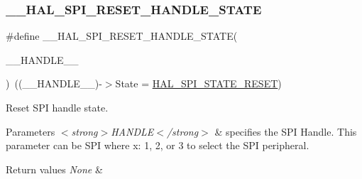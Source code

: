 \subsubsection{\texorpdfstring{\+\_\+\+\_\+\+H\+A\+L\+\_\+\+S\+P\+I\+\_\+\+R\+E\+S\+E\+T\+\_\+\+H\+A\+N\+D\+L\+E\+\_\+\+S\+T\+A\+TE}{\_\_HAL\_SPI\_RESET\_HANDLE\_STATE}}
{\footnotesize\ttfamily \#define \+\_\+\+\_\+\+H\+A\+L\+\_\+\+S\+P\+I\+\_\+\+R\+E\+S\+E\+T\+\_\+\+H\+A\+N\+D\+L\+E\+\_\+\+S\+T\+A\+TE(\begin{DoxyParamCaption}\item[{}]{\+\_\+\+\_\+\+H\+A\+N\+D\+L\+E\+\_\+\+\_\+ }\end{DoxyParamCaption})~((\+\_\+\+\_\+\+H\+A\+N\+D\+L\+E\+\_\+\+\_\+)-\/$>$State = \hyperlink{group___s_p_i___exported___types_gga8891cb64e76198a860172d94c638c9b4adbc218df2c9841b561282b40b3ded69d}{H\+A\+L\+\_\+\+S\+P\+I\+\_\+\+S\+T\+A\+T\+E\+\_\+\+R\+E\+S\+ET})}



Reset S\+PI handle state. 


\begin{DoxyParams}{Parameters}
{\em $<$strong$>$\+H\+A\+N\+D\+L\+E$<$/strong$>$} & specifies the S\+PI Handle. This parameter can be S\+PI where x\+: 1, 2, or 3 to select the S\+PI peripheral. \\
\hline
\end{DoxyParams}

\begin{DoxyRetVals}{Return values}
{\em None} & \\
\hline
\end{DoxyRetVals}

